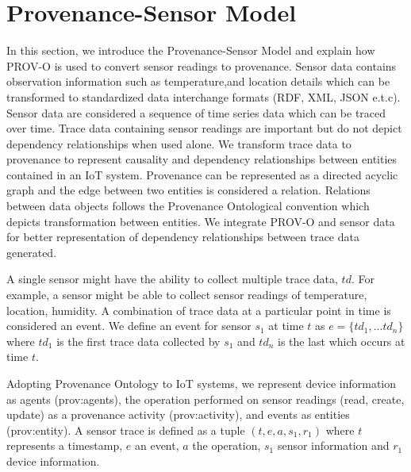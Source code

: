 \documentclass[conference]{IEEEtran}
\begin{document}



%



\section {Provenance-Sensor Model}
In this section, we introduce the Provenance-Sensor Model and explain how PROV-O is used to convert sensor readings to provenance. Sensor data contains observation information such as temperature,and location details which can be transformed to standardized data interchange formats (RDF, XML, JSON e.t.c). Sensor data are considered a sequence of time series data which can be traced over time. Trace data containing sensor readings are important but do not depict dependency relationships when used alone. We transform trace data to provenance to represent causality and dependency relationships between entities contained in an IoT system. Provenance can be represented as a directed acyclic graph and the edge between two entities is considered a relation. Relations between data objects follows the Provenance Ontological convention which depicts transformation between entities. We integrate PROV-O and sensor data for better representation of dependency relationships between trace data generated.

\par A single sensor might have the ability to collect multiple trace data, $td$. For example, a sensor might be able to collect sensor readings of temperature, location, humidity. A combination of trace data at a particular point in time is considered an event. We define an event  for sensor $s_1$ at time $t$ as $e= \{td_1, ...td_n\} $ where $td_1$ is the first trace data collected by $s_1$  and $td_n$ is the last which occurs at time $t$.





\par Adopting Provenance Ontology to IoT systems, we represent device information as agents (prov:agents), the operation performed on sensor readings (read, create, update) as a provenance activity (prov:activity), and events as entities (prov:entity). A sensor trace is defined as a tuple  $ (t, e, a, s_1, r_1)$ where $t$ represents a timestamp, $e$ an event, $a$ the operation, $s_1$ sensor information and $r_1$ device information.  
\end{document}
